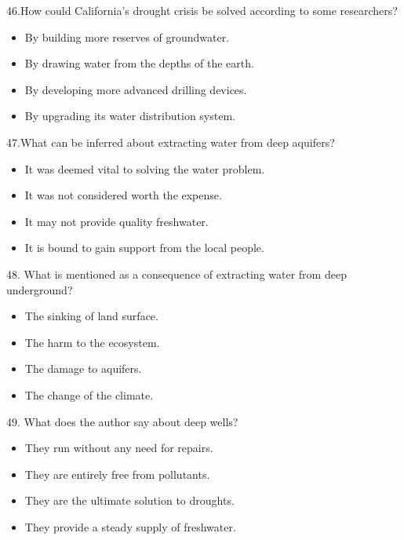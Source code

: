 \documentclass[UTF8,11pt]{ctexart}
\begin{document}
46.How could California’s drought crisis be solved according to some researchers?


\begin{itemize}[leftmargin=2em,itemsep=.2em,topsep=.4em]\item[A.] By building more reserves of groundwater.
\item[B.] By drawing water from the depths of the earth.
\item[C.] By developing more advanced drilling devices.
\item[D.] By upgrading its water distribution system.
\end{itemize}

47.What can be inferred about extracting water from deep aquifers?


\begin{itemize}[leftmargin=2em,itemsep=.2em,topsep=.4em]\item[A.] It was deemed vital to solving the water problem.
\end{itemize}

\begin{itemize}[leftmargin=2em,itemsep=.2em,topsep=.4em]\item[B.] It was not considered worth the expense.
\item[C.] It may not provide quality freshwater.
\item[D.] It is bound to gain support from the local people.
\end{itemize}

48. What is mentioned as a consequence of extracting water from deep underground?


\begin{itemize}[leftmargin=2em,itemsep=.2em,topsep=.4em]\item[A.] The sinking of land surface.
\item[B.] The harm to the ecosystem.
\item[C.] The damage to aquifers.
\item[D.] The change of the climate.
\end{itemize}

49. What does the author say about deep wells?


\begin{itemize}[leftmargin=2em,itemsep=.2em,topsep=.4em]\item[A.] They run without any need for repairs.
\item[B.] They are entirely free from pollutants.
\item[C.] They are the ultimate solution to droughts.
\item[D.] They provide a steady supply of freshwater.
\end{itemize}
\end{document}
